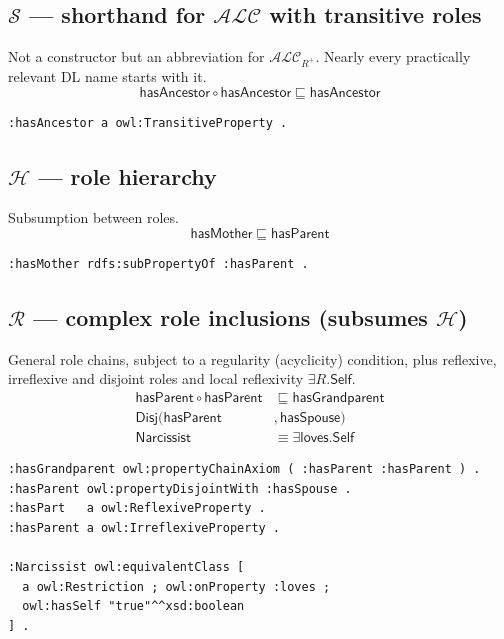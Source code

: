 \documentclass[11pt,a4paper]{article}
\newcommand{\dl}[1]{\ensuremath{\mathcal{#1}}}
\newcommand{\ALC}{\dl{ALC}}
\newcommand{\cn}[1]{\mathsf{#1}}      %
\newcommand{\rn}[1]{\mathsf{#1}}      %
\newcommand{\sub}{\sqsubseteq}
\newcommand{\eqv}{\equiv}
\newcommand{\dlaxiom}[1]{%
  \begin{displaymath}#1\end{displaymath}}
\begin{document}
\subsection*{\dl{S} --- shorthand for $\ALC$ with transitive roles}
Not a constructor but an abbreviation for $\ALC_{R^+}$. Nearly every
practically relevant DL name starts with it.
\dlaxiom{\rn{hasAncestor} \circ \rn{hasAncestor} \sub \rn{hasAncestor}}
\begin{lstlisting}
:hasAncestor a owl:TransitiveProperty .
\end{lstlisting}

\subsection*{\dl{H} --- role hierarchy}
Subsumption between roles.
\dlaxiom{\rn{hasMother} \sub \rn{hasParent}}
\begin{lstlisting}
:hasMother rdfs:subPropertyOf :hasParent .
\end{lstlisting}

\subsection*{\dl{R} --- complex role inclusions (subsumes \dl{H})}
General role chains, subject to a regularity (acyclicity) condition, plus
reflexive, irreflexive and disjoint roles and local reflexivity
$\exists R.\mathsf{Self}$.
\begin{align*}
  \rn{hasParent} \circ \rn{hasParent} &\sub \rn{hasGrandparent}\\
  \mathsf{Disj}(\rn{hasParent}&, \rn{hasSpouse})\\
  \cn{Narcissist} &\eqv \exists \rn{loves}.\mathsf{Self}
\end{align*}
\begin{lstlisting}
:hasGrandparent owl:propertyChainAxiom ( :hasParent :hasParent ) .
:hasParent owl:propertyDisjointWith :hasSpouse .
:hasPart   a owl:ReflexiveProperty .
:hasParent a owl:IrreflexiveProperty .

:Narcissist owl:equivalentClass [
  a owl:Restriction ; owl:onProperty :loves ;
  owl:hasSelf "true"^^xsd:boolean
] .
\end{lstlisting}
\end{document}
